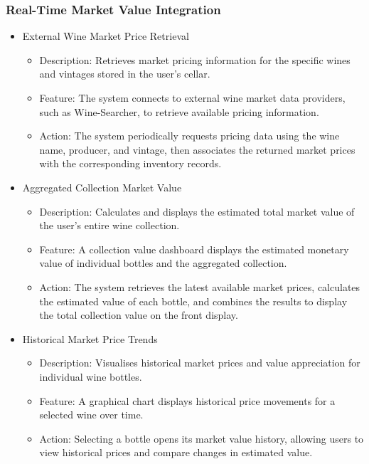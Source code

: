\documentclass[conference]{IEEEtran}
\begin{document}
\subsubsection{Real-Time Market Value Integration}
\begin{itemize}
    \item External Wine Market Price Retrieval
    \begin{itemize}
        \item Description: Retrieves market pricing information for the specific wines and vintages stored in the user's cellar.
        \item Feature: The system connects to external wine market data providers, such as Wine-Searcher, to retrieve available pricing information.
        \item Action: The system periodically requests pricing data using the wine name, producer, and vintage, then associates the returned market prices with the corresponding inventory records.
    \end{itemize}

    \item Aggregated Collection Market Value
    \begin{itemize}
        \item Description: Calculates and displays the estimated total market value of the user's entire wine collection.
        \item Feature: A collection value dashboard displays the estimated monetary value of individual bottles and the aggregated collection.
        \item Action: The system retrieves the latest available market prices, calculates the estimated value of each bottle, and combines the results to display the total collection value on the front display.
    \end{itemize}

    \item Historical Market Price Trends
    \begin{itemize}
        \item Description: Visualises historical market prices and value appreciation for individual wine bottles.
        \item Feature: A graphical chart displays historical price movements for a selected wine over time.
        \item Action: Selecting a bottle opens its market value history, allowing users to view historical prices and compare changes in estimated value.
    \end{itemize}
\end{itemize}
\end{document}
